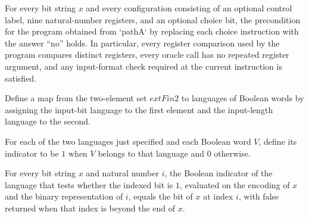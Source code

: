 \begin{lemma}
\label{Complexity.LogProg.pathA_npreS}
\leanok
{}
For every bit string $x$ and every configuration consisting of an optional control
label, nine natural-number registers, and an optional choice bit, the precondition for
the program obtained from `pathA` by replacing each choice instruction with the answer
“no” holds. In particular, every register comparison used by the program compares
distinct registers, every oracle call has no repeated register argument, and any
input-format check required at the current instruction is satisfied.
\end{lemma}

\begin{definition}
\label{Complexity.LogProg.pathAs}
\leanok
{}
Define a map from the two-element set $	ext{Fin }2$ to languages of Boolean words by
assigning the input-bit language to the first element and the input-length language to
the second.
\end{definition}

\begin{definition}
\label{Complexity.LogProg.pathOr}
\leanok
{}
For each of the two languages just specified and each Boolean word $V$, define its
indicator to be $1$ when $V$ belongs to that language and $0$ otherwise.
\end{definition}

\begin{lemma}
\label{Complexity.LogProg.pathOr_bit}
\leanok
{}
For every bit string $x$ and natural number $i$, the Boolean indicator of the language
that tests whether the indexed bit is $1$, evaluated on the encoding of $x$ and the
binary representation of $i$, equals the bit of $x$ at index $i$, with false returned
when that index is beyond the end of $x$.
\end{lemma}

